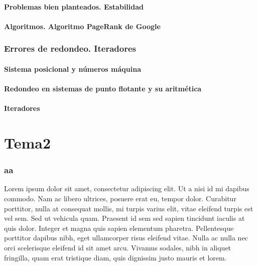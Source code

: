 \documentclass[10pt, a4paper]{article}
\theoremstyle{theorem-style}
\theoremstyle{definition-style}
\theoremstyle{remark-style}
\theoremstyle{example-style}
\theoremstyle{definition-style}
\theoremstyle{remark-style}
\begin{document}
\subsection{Problemas bien planteados. Estabilidad}


\subsection{Algoritmos. Algoritmo PageRank de Google}


\section{Errores de redondeo. Iteradores}


\subsection{Sistema posicional y números máquina}


\subsection{Redondeo en sistemas de punto flotante y su aritmética}


\subsection{Iteradores}


\part{Tema2}


\section{aa}

Lorem ipsum dolor sit amet, consectetur adipiscing elit. Ut a nisi id mi dapibus commodo. Nam ac libero ultrices, posuere erat eu, tempor dolor. Curabitur porttitor, nulla at consequat mollis, mi turpis varius elit, vitae eleifend turpis est vel sem. Sed ut vehicula quam. Praesent id sem sed sapien tincidunt iaculis at quis dolor. Integer et magna quis sapien elementum pharetra. Pellentesque porttitor dapibus nibh, eget ullamcorper risus eleifend vitae. Nulla ac nulla nec orci scelerisque eleifend id sit amet arcu. Vivamus sodales, nibh in aliquet fringilla, quam erat tristique diam, quis dignissim justo mauris et lorem.
\end{document}
